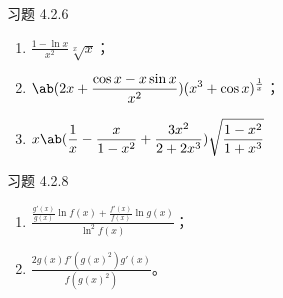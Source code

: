 \begin{problem}
	习题 4.2.6

	\begin{solution}
		\begin{enumerate}
			\item[\textbf{1)}] $\displaystyle \frac{1 - \ln x}{x^2} \sqrt[x]{x}$；
			\item[\textbf{2)}] $\displaystyle \ab(2x + \frac{\cos x - x \sin x}{x^2}) (x^3 + \cos x)^{\frac{1}{x}}$；
			\item[\textbf{5)}] $\displaystyle x \ab(\frac{1}{x} - \frac{x}{1 - x^2} + \frac{3x^2}{2 + 2x^3}) \sqrt{\frac{1 - x^2}{1 + x^3}}$
		\end{enumerate}
	\end{solution}
\end{problem}

\begin{problem}
	习题 4.2.8

	\begin{solution}
		\begin{enumerate}
			\item[\textbf{3)}] $\displaystyle \frac{\frac{g'(x)}{g(x)} \ln f(x) + \frac{f'(x)}{f(x)} \ln g(x)}{\ln^2 f(x)}$；
			\item[\textbf{4)}] $\frac{2 g(x) f'(g(x)^2) g'(x)}{f(g(x)^2)}$。
		\end{enumerate}
	\end{solution}
\end{problem}

